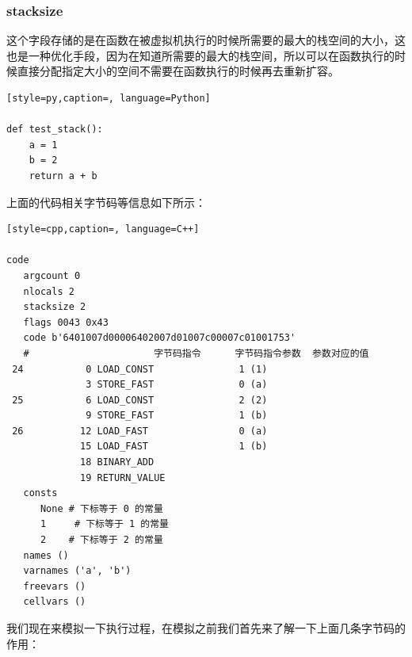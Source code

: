 \subsubsection{stacksize}
这个字段存储的是在函数在被虚拟机执行的时候所需要的最大的栈空间的大小，这也是一种优化手段，因为在知道所需要的最大的栈空间，所以可以在函数执行的时候直接分配指定大小的空间不需要在函数执行的时候再去重新扩容。
\begin{lstlisting}[style=py,caption=, language=Python]

def test_stack():
    a = 1
    b = 2
    return a + b
\end{lstlisting}
上面的代码相关字节码等信息如下所示：
\begin{lstlisting}[style=cpp,caption=, language=C++]

code
   argcount 0
   nlocals 2
   stacksize 2
   flags 0043 0x43
   code b'6401007d00006402007d01007c00007c01001753'
   #					  字节码指令		 字节码指令参数  参数对应的值
 24           0 LOAD_CONST               1 (1)
              3 STORE_FAST               0 (a)
 25           6 LOAD_CONST               2 (2)
              9 STORE_FAST               1 (b)
 26          12 LOAD_FAST                0 (a)
             15 LOAD_FAST                1 (b)
             18 BINARY_ADD
             19 RETURN_VALUE
   consts
      None # 下标等于 0 的常量
      1 	# 下标等于 1 的常量
      2	   # 下标等于 2 的常量
   names ()
   varnames ('a', 'b')
   freevars ()
   cellvars ()
\end{lstlisting}
我们现在来模拟一下执行过程，在模拟之前我们首先来了解一下上面几条字节码的作用：
